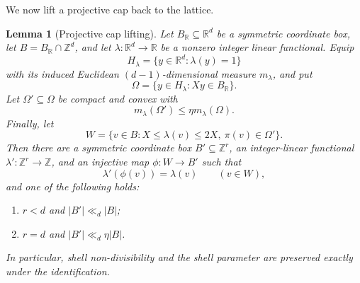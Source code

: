 \documentclass[11pt,reqno]{amsart}
\newtheorem{lemma}[theorem]{Lemma}
\theoremstyle{definition}
\theoremstyle{remark}
\newcommand{\Z}{\mathbb Z}
\newcommand{\R}{\mathbb R}
\begin{document}
We now lift a projective cap back to the lattice.

\begin{lemma}[Projective cap lifting]
\label{lem:cap-lifting}
Let $B_{\R}\subseteq\R^d$ be a symmetric coordinate box, let
$B=B_{\R}\cap\Z^d$, and let $\lambda:\R^d\to\R$ be a nonzero integer
linear functional.  Equip
\[
 H_\lambda=\{y\in\R^d:\lambda(y)=1\}
\]
with its induced Euclidean $(d-1)$-dimensional measure $m_\lambda$, and put
\[
 \Omega=\{y\in H_\lambda:Xy\in B_{\R}\}.
\]
Let $\Omega'\subseteq\Omega$ be compact and convex with
\[
 m_\lambda(\Omega')\le\eta m_\lambda(\Omega).
\]
Finally, let
\[
 W=\{v\in B:X\le\lambda(v)\le2X,\ \pi(v)\in\Omega'\}.
\]
Then there are a symmetric coordinate box $B'\subseteq\Z^r$, an
integer-linear functional $\lambda':\Z^r\to\Z$, and an injective map
$\phi:W\to B'$ such that
\[
 \lambda'(\phi(v))=\lambda(v)\qquad(v\in W),
\]
and one of the following holds:
\begin{enumerate}[label=(\roman*)]
 \item $r<d$ and $|B'|\ll_d|B|$;
 \item $r=d$ and $|B'|\ll_d\eta|B|$.
\end{enumerate}
In particular, shell non-divisibility and the shell parameter are preserved
exactly under the identification.
\end{lemma}
\end{document}
